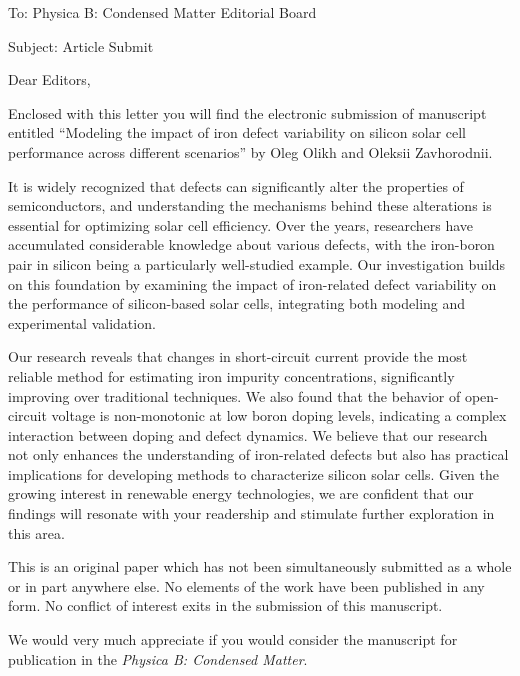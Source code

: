 \documentclass[preprint]{elsarticle}
\begin{document}
To:
Physica B: Condensed Matter Editorial Board


Subject:
Article Submit

\vspace{5mm}
Dear Editors,

\vspace{3mm}
Enclosed with this letter you will find the electronic submission of manuscript entitled
``Modeling the impact of iron defect variability on silicon solar cell performance across different scenarios'' 
by Oleg Olikh and Oleksii Zavhorodnii.

It is widely recognized that defects can significantly alter the properties of semiconductors, 
and understanding the mechanisms behind these alterations is essential for optimizing solar cell efficiency. 
Over the years, researchers have accumulated considerable knowledge about various defects, 
with the iron-boron pair in silicon being a particularly well-studied example.
Our investigation builds on this foundation by examining the impact of iron-related defect variability 
on the performance of silicon-based solar cells, integrating both modeling and experimental validation.

Our research reveals that changes in short-circuit current provide the most reliable method for estimating iron impurity concentrations, 
significantly improving over traditional techniques. 
We also found that the behavior of open-circuit voltage is non-monotonic at low boron doping levels, 
indicating a complex interaction between doping and defect dynamics. 
We believe that our research not only enhances the understanding of iron-related defects 
but also has practical implications for developing methods to characterize silicon solar cells.
Given the growing interest in renewable energy technologies, 
we are confident that our findings will resonate with your readership and stimulate further exploration in this area.


This is an original paper which has not been simultaneously submitted as a whole or in part anywhere else.
No elements of the work have been published in any form.
No conflict of interest exits in the submission of this manuscript.


We would  very much appreciate if you would consider the manuscript for publication in the \emph{Physica B: Condensed Matter}.
\end{document}
